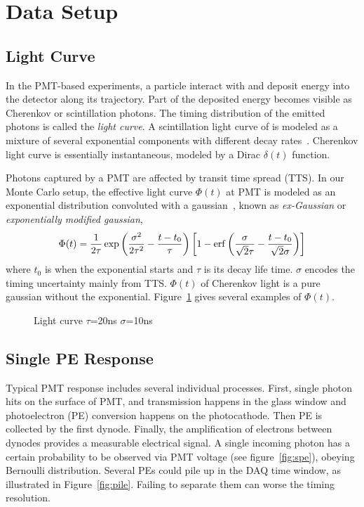 \section{Data Setup} %
\label{sec:toyMC}

\subsection{Light Curve}
In the PMT-based experiments, a particle interact with and deposit energy into the detector along its trajectory. Part of the deposited energy becomes visible as Cherenkov or scintillation photons.  The timing distribution of the emitted photons is called the \textit{light curve}.  A scintillation light curve of is modeled as a mixture of several exponential components with different decay rates~\cite{ludhova_particle_2020}.  Cherenkov light curve is essentially instantaneous, modeled by a Dirac $\delta(t)$ function.

Photons captured by a PMT are affected by transit time spread (TTS).  In our Monte Carlo setup, the effective light curve $\Phi(t)$ at PMT is modeled as an exponential distribution convoluted with a gaussian~\cite{li_separation_2016}, known as \textit{ex-Gaussian} or \textit{exponentially modified gaussian},
\begin{align}
    \Phi(t) = \frac{1}{2\tau} \exp\left(\frac{\sigma^2}{2\tau^2}-\frac{t-t_0}{\tau}\right) \left[1 - \operatorname{erf}\left( \frac{\sigma}{\sqrt{2}\tau} - \frac{t-t_0}{\sqrt{2}\sigma} \right)\right]
    \label{eq:time-pro}
\end{align}
where $t_0$ is when the exponential starts and $\tau$ is its decay life time.  $\sigma$ encodes the timing uncertainty mainly from TTS.  $\Phi(t)$ of Cherenkov light is a pure gaussian without the exponential.  Figure~\ref{fig:time-pro} gives several examples of $\Phi(t)$.

\begin{figure}
  \centering
  \resizebox{0.6\textwidth}{!}{}
  \caption{\label{fig:time-pro} Light curve $\tau$=20ns $\sigma$=10ns}
\end{figure}

\subsection{Single PE Response}

Typical PMT response includes several individual processes. First, single photon hits on the surface of PMT, and transmission happens in the glass window and photoelectron (PE) conversion happens on the photocathode. Then PE is collected by the first dynode. Finally, the amplification of electrons between dynodes provides a measurable electrical signal. A single incoming photon has a certain probability to be observed via PMT voltage (see figure~\ref{fig:spe}), obeying Bernoulli distribution. Several PEs could pile up in the DAQ time window, as illustrated in Figure~\ref{fig:pile}.  Failing to separate them can worse the timing resolution.

